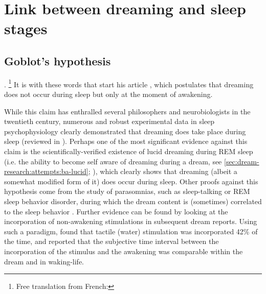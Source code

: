\section{Link between dreaming and sleep stages}
\label{sec:dream-research:link}

\subsection{Goblot's hypothesis}
\label{sec:dream-research:link:goblot}

. \footnote{Free translation from French: } It is with these words that \citet{goblot_souvenir_1896} start his article , which postulates that dreaming does not occur during sleep but only at the moment of awakening.

While this claim has enthralled several philosophers and neurobiologists in the twentieth century, numerous and robust experimental data in sleep psychophysiology clearly demonstrated that dreaming does take place during sleep (reviewed in \citealp{guenole_reve_2010}). Perhaps one of the most significant evidence against this claim is the scientifically-verified existence of lucid dreaming during REM sleep (i.e. the ability to become self aware of dreaming during a dream, see \ref{sec:dream-research:attempts:ba-lucid}; \citealp{laberge_exploring_1991, dresler_neural_2012}), which clearly shows that dreaming (albeit a somewhat modified form of it) does occur during sleep. Other proofs against this hypothesis come from the study of parasomnias, such as sleep-talking or REM sleep behavior disorder, during which the dream content is (sometimes) correlated to the sleep behavior \citep{ellman_mind_1991, schenck_rem_2002, leclair-visonneau_eyes_2010}. Further evidence can be found by looking at the incorporation of non-awakening stimulations in subsequent dream reports. Using such a paradigm, \citet{dement_relation_1958} found that tactile (water) stimulation was incorporated 42\% of the time, and reported that the subjective time interval between the incorporation of the stimulus and the awakening was comparable within the dream and in waking-life.

